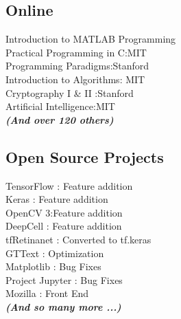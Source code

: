 \documentclass[]{deedy-resume-openfont}
\begin{document}
\begin{minipage}[t]{0.33\textwidth}

\subsection{Online}
Introduction to MATLAB Programming\\
Practical Programming in C:MIT\\
Programming Paradigms:Stanford \\
Introduction to Algorithms: MIT \\
Cryptography I \& II :Stanford\\
Artificial Intelligence:MIT\\
{\footnotesize \textit{\textbf{(And over 120 others) }}} \\
\sectionsep


\subsection{Open Source Projects}
TensorFlow : Feature addition\\
Keras : Feature addition \\
OpenCV 3:Feature addition\\
DeepCell : Feature addition \\
tfRetinanet : Converted to tf.keras \\
GTText : Optimization \\
Matplotlib : Bug Fixes\\
Project Jupyter : Bug Fixes \\
Mozilla : Front End\\

{\footnotesize \textit{\textbf{(And so many more ...) }}} \\
\sectionsep


%
%

\end{minipage} 
\hfill
\end{document}

